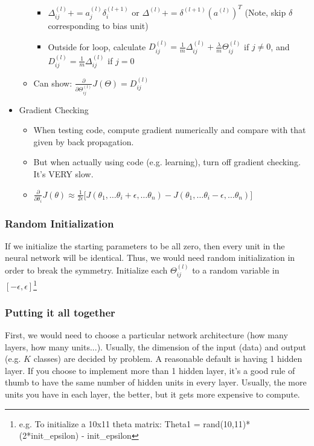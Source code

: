 \documentclass[letterpaper,10pt]{article}
\begin{document}
\begin{itemize}
\begin{itemize}
\begin{itemize}
		\item $\Delta_{ij}^{(l)} += a_j^{(l)}\delta_i^{(l+1)}$ or $\Delta^{(l)} += \delta^{(l+1)} (a^{(l)})^T$ (Note, skip $\delta$ corresponding to bias unit)
		\item Outside for loop, calculate $D_{ij}^{(l)} = \frac{1}{m} \Delta_{ij}^{(l)} + \frac{\lambda}{m} \Theta_{ij}^{(l)}$ if $j \neq 0$, and $D_{ij}^{(l)} = \frac{1}{m} \Delta_{ij}^{(l)}$ if $j=0$
		\end{itemize}
	\item Can show: $\frac{\partial}{\partial \Theta_{ij}^{(l)}} J(\Theta) = D_{ij}^{(l)}$
	\end{itemize}
\item Gradient Checking
	\begin{itemize}
	\item When testing code, compute gradient numerically and compare with that given by back propagation.
	\item But when actually using code (e.g. learning), turn off gradient checking. It's VERY slow.
	\item $\frac{\partial}{\partial \theta_i} J(\theta) \approx \frac{1}{2\epsilon} \big[ J(\theta_1, \ldots \theta_i + \epsilon, \ldots \theta_n) - J(\theta_1, \ldots \theta_i - \epsilon, \ldots \theta_n) \big] $
	\end{itemize}
	
\end{itemize}
	
\subsubsection{Random Initialization}

If we initialize the starting parameters to be all zero, then every unit in the neural network will be identical. Thus, we would need random initialization in order to break the symmetry.
Initialize each $\Theta_{ij}^{(l)}$ to a random variable in $[-\epsilon, \epsilon]$\footnote{e.g. To initialize a 10x11 theta matrix: Theta1 = rand(10,11)*(2*init\_epsilon) - init\_epsilon}
	
\subsubsection{Putting it all together}
First, we would need to choose a particular network architecture (how many layers, how many units...). Usually, the dimension of the input (data) and output (e.g. $K$ classes) are decided by problem. A reasonable default is having 1 hidden layer. If you choose to implement more than 1 hidden layer, it's a good rule of thumb to have the same number of hidden units in every layer. Usually, the more units you have in each layer, the better, but it gets more expensive to compute.
\end{document}
